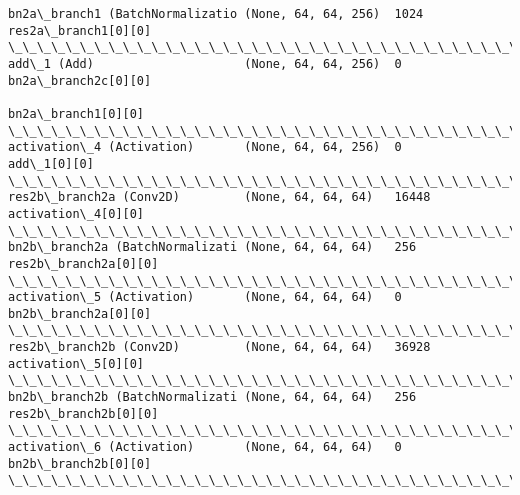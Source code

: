 \documentclass[11pt]{article}
\begin{document}
\begin{Verbatim}[commandchars=\\\{\}]
bn2a\_branch1 (BatchNormalizatio (None, 64, 64, 256)  1024        res2a\_branch1[0][0]              
\_\_\_\_\_\_\_\_\_\_\_\_\_\_\_\_\_\_\_\_\_\_\_\_\_\_\_\_\_\_\_\_\_\_\_\_\_\_\_\_\_\_\_\_\_\_\_\_\_\_\_\_\_\_\_\_\_\_\_\_\_\_\_\_\_\_\_\_\_\_\_\_\_\_\_\_\_\_\_\_\_\_\_\_\_\_\_\_\_\_\_\_\_\_\_\_\_\_
add\_1 (Add)                     (None, 64, 64, 256)  0           bn2a\_branch2c[0][0]              
                                                                 bn2a\_branch1[0][0]               
\_\_\_\_\_\_\_\_\_\_\_\_\_\_\_\_\_\_\_\_\_\_\_\_\_\_\_\_\_\_\_\_\_\_\_\_\_\_\_\_\_\_\_\_\_\_\_\_\_\_\_\_\_\_\_\_\_\_\_\_\_\_\_\_\_\_\_\_\_\_\_\_\_\_\_\_\_\_\_\_\_\_\_\_\_\_\_\_\_\_\_\_\_\_\_\_\_\_
activation\_4 (Activation)       (None, 64, 64, 256)  0           add\_1[0][0]                      
\_\_\_\_\_\_\_\_\_\_\_\_\_\_\_\_\_\_\_\_\_\_\_\_\_\_\_\_\_\_\_\_\_\_\_\_\_\_\_\_\_\_\_\_\_\_\_\_\_\_\_\_\_\_\_\_\_\_\_\_\_\_\_\_\_\_\_\_\_\_\_\_\_\_\_\_\_\_\_\_\_\_\_\_\_\_\_\_\_\_\_\_\_\_\_\_\_\_
res2b\_branch2a (Conv2D)         (None, 64, 64, 64)   16448       activation\_4[0][0]               
\_\_\_\_\_\_\_\_\_\_\_\_\_\_\_\_\_\_\_\_\_\_\_\_\_\_\_\_\_\_\_\_\_\_\_\_\_\_\_\_\_\_\_\_\_\_\_\_\_\_\_\_\_\_\_\_\_\_\_\_\_\_\_\_\_\_\_\_\_\_\_\_\_\_\_\_\_\_\_\_\_\_\_\_\_\_\_\_\_\_\_\_\_\_\_\_\_\_
bn2b\_branch2a (BatchNormalizati (None, 64, 64, 64)   256         res2b\_branch2a[0][0]             
\_\_\_\_\_\_\_\_\_\_\_\_\_\_\_\_\_\_\_\_\_\_\_\_\_\_\_\_\_\_\_\_\_\_\_\_\_\_\_\_\_\_\_\_\_\_\_\_\_\_\_\_\_\_\_\_\_\_\_\_\_\_\_\_\_\_\_\_\_\_\_\_\_\_\_\_\_\_\_\_\_\_\_\_\_\_\_\_\_\_\_\_\_\_\_\_\_\_
activation\_5 (Activation)       (None, 64, 64, 64)   0           bn2b\_branch2a[0][0]              
\_\_\_\_\_\_\_\_\_\_\_\_\_\_\_\_\_\_\_\_\_\_\_\_\_\_\_\_\_\_\_\_\_\_\_\_\_\_\_\_\_\_\_\_\_\_\_\_\_\_\_\_\_\_\_\_\_\_\_\_\_\_\_\_\_\_\_\_\_\_\_\_\_\_\_\_\_\_\_\_\_\_\_\_\_\_\_\_\_\_\_\_\_\_\_\_\_\_
res2b\_branch2b (Conv2D)         (None, 64, 64, 64)   36928       activation\_5[0][0]               
\_\_\_\_\_\_\_\_\_\_\_\_\_\_\_\_\_\_\_\_\_\_\_\_\_\_\_\_\_\_\_\_\_\_\_\_\_\_\_\_\_\_\_\_\_\_\_\_\_\_\_\_\_\_\_\_\_\_\_\_\_\_\_\_\_\_\_\_\_\_\_\_\_\_\_\_\_\_\_\_\_\_\_\_\_\_\_\_\_\_\_\_\_\_\_\_\_\_
bn2b\_branch2b (BatchNormalizati (None, 64, 64, 64)   256         res2b\_branch2b[0][0]             
\_\_\_\_\_\_\_\_\_\_\_\_\_\_\_\_\_\_\_\_\_\_\_\_\_\_\_\_\_\_\_\_\_\_\_\_\_\_\_\_\_\_\_\_\_\_\_\_\_\_\_\_\_\_\_\_\_\_\_\_\_\_\_\_\_\_\_\_\_\_\_\_\_\_\_\_\_\_\_\_\_\_\_\_\_\_\_\_\_\_\_\_\_\_\_\_\_\_
activation\_6 (Activation)       (None, 64, 64, 64)   0           bn2b\_branch2b[0][0]              
\_\_\_\_\_\_\_\_\_\_\_\_\_\_\_\_\_\_\_\_\_\_\_\_\_\_\_\_\_\_\_\_\_\_\_\_\_\_\_\_\_\_\_\_\_\_\_\_\_\_\_\_\_\_\_\_\_\_\_\_\_\_\_\_\_\_\_\_\_\_\_\_\_\_\_\_\_\_\_\_\_\_\_\_\_\_\_\_\_\_\_\_\_\_\_\_\_\_

\end{Verbatim}
\end{document}
